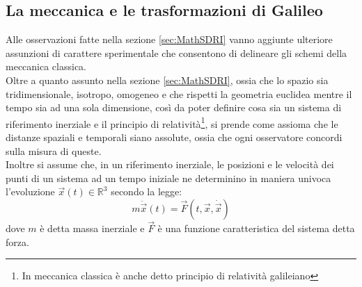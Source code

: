 \subsection{La meccanica e le trasformazioni di Galileo}\label{sec:MC}
Alle osservazioni fatte nella sezione \ref{sec:MathSDRI} vanno aggiunte ulteriore assunzioni di carattere sperimentale che consentono di delineare gli schemi della meccanica classica.\\

Oltre a quanto assunto nella sezione \ref{sec:MathSDRI}, ossia che lo spazio sia tridimensionale, isotropo, omogeneo e che rispetti la geometria euclidea mentre il tempo sia ad una sola dimensione, così da poter definire cosa sia un sistema di riferimento inerziale e il principio di relatività\footnote{In meccanica classica è anche detto principio di relatività galileiano}, si prende come assioma che le distanze spaziali e temporali siano assolute, ossia che ogni osservatore concordi sulla misura di queste.\\

Inoltre si assume che, in un riferimento inerziale, le posizioni e le velocità dei punti di un sistema ad un tempo iniziale ne determinino in maniera univoca l'evoluzione $\vec x(t)\in \mathbb{R}^3$ secondo la legge:
\begin{equation}
	m\ddot{\vec{x}}(t)=\vec{F}(t,\vec{x},\dot{\vec{x}})
	\label{equazioneDiNewton}
\end{equation}
dove $m$ è detta massa inerziale e $\vec{F}$ è una funzione caratteristica del sistema detta forza.\\

